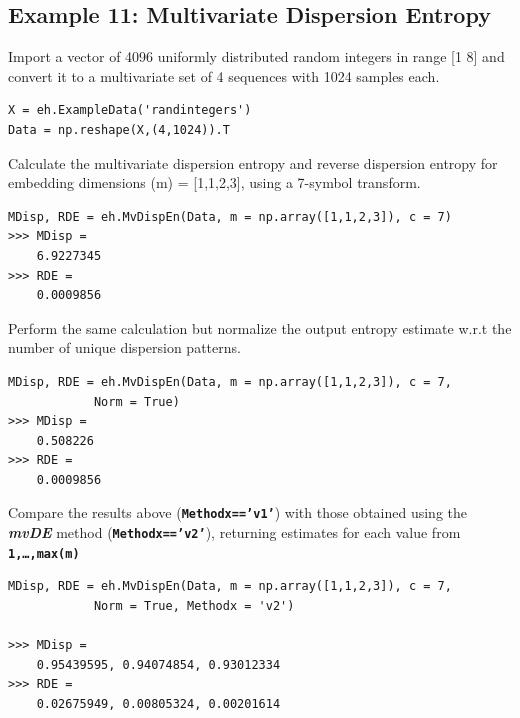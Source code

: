 \documentclass[12pt, a4paper, titlepage, openany]{book}
\begin{document}
\subsection{\normalsize Example 11: \hspace{15mm} Multivariate Dispersion Entropy}
\noindent Import a vector of 4096 uniformly distributed random integers in range [1 8] and convert it to a multivariate set of 4 sequences with 1024 samples each.
\begin{verbatim}
X = eh.ExampleData('randintegers')
Data = np.reshape(X,(4,1024)).T
\end{verbatim}
Calculate the multivariate dispersion entropy and reverse dispersion entropy for embedding dimensions (m) = [1,1,2,3], using a 7-symbol transform.
\begin{verbatim}
MDisp, RDE = eh.MvDispEn(Data, m = np.array([1,1,2,3]), c = 7)
>>> MDisp =
    6.9227345
>>> RDE =
    0.0009856
\end{verbatim}
Perform the same calculation but normalize the output entropy estimate w.r.t the number of unique dispersion patterns.
\begin{verbatim}
MDisp, RDE = eh.MvDispEn(Data, m = np.array([1,1,2,3]), c = 7, 
			Norm = True)
>>> MDisp =
    0.508226
>>> RDE =
    0.0009856
\end{verbatim}    
Compare the results above (\texttt{\textbf{Methodx=='v1'}}) with those obtained using the \emph{\textbf{mvDE}} method (\texttt{\textbf{Methodx=='v2'}}), returning estimates for each value from \texttt{\textbf{1,…,max(m)}}
\begin{verbatim}
MDisp, RDE = eh.MvDispEn(Data, m = np.array([1,1,2,3]), c = 7, 
			Norm = True, Methodx = 'v2')

>>> MDisp =
    0.95439595, 0.94074854, 0.93012334
>>> RDE =
    0.02675949, 0.00805324, 0.00201614
\end{verbatim}



\newpage
\end{document}

